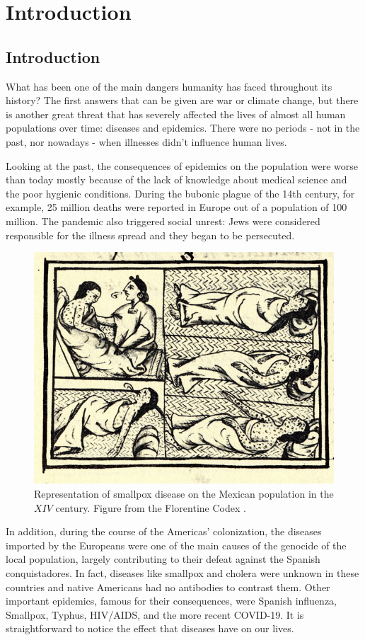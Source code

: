 \part{Introduction}

\chapter{Introduction}

What has been one of the main dangers humanity has faced throughout its history? The first answers that can be given are war or climate change, but there is another great threat that has severely affected the lives of almost all human populations over time: diseases and epidemics. There were no periods - not in the past, nor nowadays - when illnesses didn't influence human lives. 

Looking at the past, the consequences of epidemics on the population were worse than today mostly because of the lack of knowledge about medical science and the poor hygienic conditions. During the bubonic plague of the 14th century, for example, 25 million deaths were reported in Europe out of a population of 100 million. The pandemic also triggered social unrest: Jews were considered responsible for the illness spread and they began to be persecuted.

\begin{figure}[]
	\centering
	\includegraphics[width=0.4\linewidth]{0_introduction/images_introduction/FlorentineCodex_smallpox}
	\caption[Smallpox on native Americans]{Representation of smallpox disease on the Mexican population in the $XIV$ century. Figure from the Florentine Codex \cite{Sahagun1965}. }
	\label{fig:florentinecodexsmallpox}
\end{figure}

In addition, during the course of the Americas' colonization, the diseases imported by the Europeans were one of the main causes of the genocide of the local population, largely contributing to their defeat against the Spanish conquistadores. In fact, diseases like smallpox and cholera were unknown in these countries and native Americans had no antibodies to contrast them. 
Other important epidemics, famous for their consequences, were Spanish influenza, Smallpox, Typhus, HIV/AIDS, and the more recent COVID-19. 
It is straightforward to notice the effect that diseases have on our lives.

